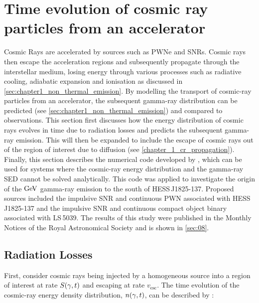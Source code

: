 \chapter[Time evolution of CR particles]{Time evolution of cosmic ray particles from an accelerator} \label{sec:07_particle_ev}

Cosmic Rays are accelerated by sources such as PWNe and SNRs. Cosmic rays then escape the acceleration regions and subsequently propagate through the interstellar medium, losing energy through various processes such as radiative cooling, adiabatic expansion and ionisation as discussed in \autoref{sec:chapter1_non_thermal_emission}. By modelling the transport of cosmic-ray particles from an accelerator, the subsequent gamma-ray distribution can be predicted (see \autoref{sec:chapter1_non_thermal_emission}) and compared to observations.
\newpar
This section first discusses how the energy distribution of cosmic rays evolves in time due to radiation losses and predicts the subsequent gamma-ray emission. This will then be expanded to include the escape of cosmic rays out of the region of interest due to diffusion (see \autoref{chapter_1_cr_propagation}). Finally, this section describes the numerical code developed by \cite{fabien}, which can be used for systems where the cosmic-ray energy distribution and the gamma-ray SED cannot be solved analytically.
\newpar
This code was applied to investigate the origin of the $\si{\giga\electronvolt}$ gamma-ray emission to the south of \mbox{HESS\,J1825-137}. Proposed sources included the impulsive SNR and continuous PWN associated with \mbox{HESS\,J1825-137} and the impulsive SNR and continuous compact object binary associated with \mbox{LS\,5039}. The results of this study were published in the Monthly Notices of the Royal Astronomical Society and is shown in \autoref{sec:08}.

\section{Radiation Losses} \label{sec:chapter_7_cr_SED_evol} 

First, consider cosmic rays being injected by a homogeneous source into a region of interest at rate $S\qty(\gamma,t)$ and escaping at rate $v_\text{esc}$. The time evolution of the cosmic-ray energy density distribution, $n\qty(\gamma,t)$, can be described by \citep{1980gbs..bookR....M}:

